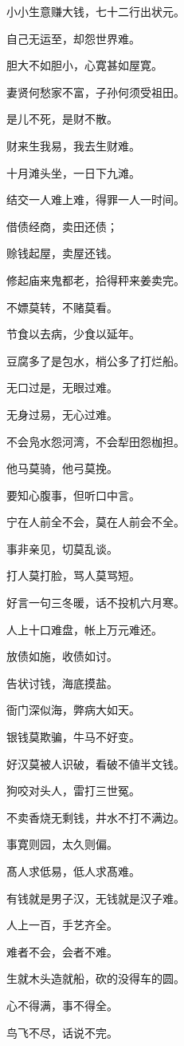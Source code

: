\documentclass[12pt,oneside]{book}
\begin{document}
小小生意赚大钱，七十二行出状元。

自己无运至，却怨世界难。

胆大不如胆小，心寛甚如屋寛。

妻贤何愁家不富，子孙何须受祖田。

是儿不死，是财不散。

财来生我易，我去生财难。

十月滩头坐，一日下九滩。

结交一人难上难，得罪一人一时间。

借债经商，卖田还债；

赊钱起屋，卖屋还钱。

修起庙来鬼都老，拾得秤来姜卖完。

不嫖莫转，不赌莫看。

节食以去病，少食以延年。

豆腐多了是包水，梢公多了打烂船。

无口过是，无眼过难。

无身过易，无心过难。

不会凫水怨河湾，不会犁田怨枷担。

他马莫骑，他弓莫挽。

要知心腹事，但听口中言。

宁在人前全不会，莫在人前会不全。

事非亲见，切莫乱谈。

打人莫打脸，骂人莫骂短。

好言一句三冬暖，话不投机六月寒。

人上十口难盘，帐上万元难还。

放债如施，收债如讨。

告状讨钱，海底摸盐。

衙门深似海，弊病大如天。

银钱莫欺骗，牛马不好变。

好汉莫被人识破，看破不値半文钱。

狗咬对头人，雷打三世冤。

不卖香烧无剩钱，井水不打不满边。

事寛则园，太久则偏。

髙人求低易，低人求髙难。

有钱就是男子汉，无钱就是汉子难。

人上一百，手艺齐全。

难者不会，会者不难。

生就木头造就船，砍的没得车的圆。

心不得满，事不得全。

鸟飞不尽，话说不完。
\end{document}
